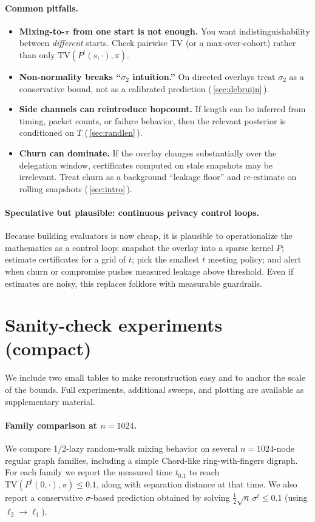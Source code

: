 \documentclass[11pt]{article}
\newcommand{\TV}{\mathrm{TV}}
\begin{document}
\paragraph{Common pitfalls.}
\begin{itemize}[leftmargin=1.2em]
\item \textbf{Mixing-to-$\pi$ from one start is not enough.} You want indistinguishability between \emph{different} starts.
Check pairwise TV (or a max-over-cohort) rather than only $\TV(P^t(s,\cdot),\pi)$.
\item \textbf{Non-normality breaks ``$\sigma_2$ intuition.''} On directed overlays treat $\sigma_2$ as a conservative bound,
not as a calibrated prediction (\,\cref{sec:debruijn}\,).
\item \textbf{Side channels can reintroduce hopcount.} If length can be inferred from timing, packet counts, or failure behavior,
then the relevant posterior is conditioned on $T$ (\,\cref{sec:randlen}\,).
\item \textbf{Churn can dominate.} If the overlay changes substantially over the delegation window,
certificates computed on stale snapshots may be irrelevant. Treat churn as a background ``leakage floor'' and
re-estimate on rolling snapshots (\,\cref{sec:intro}\,).
\end{itemize}

\paragraph{Speculative but plausible: continuous privacy control loops.}
Because building evaluators is now cheap, it is plausible to operationalize the mathematics as a control loop:
snapshot the overlay into a sparse kernel $P$; estimate certificates for a grid of $t$; pick the smallest $t$
meeting policy; and alert when churn or compromise pushes measured leakage above threshold.
Even if estimates are noisy, this replaces folklore with measurable guardrails.


\section{Sanity-check experiments (compact)}\label{sec:experiments}
We include two small tables to make reconstruction easy and to anchor the scale
of the bounds. Full experiments, additional sweeps, and plotting are available as
supplementary material.

\paragraph{Family comparison at $n=1024$.}
We compare 1/2-lazy random-walk mixing behavior on several $n=1024$-node regular
graph families, including a simple Chord-like ring-with-fingers digraph.
For each family we report the measured time $t_{0.1}$ to reach
$\TV(P^t(0,\cdot),\pi)\le 0.1$, along with separation distance at that time.
We also report a conservative $\sigma$-based prediction obtained by solving
$\tfrac12\sqrt{n}\,\sigma^t\le 0.1$ (using $\ell_2\!\to\!\ell_1$).
\end{document}
